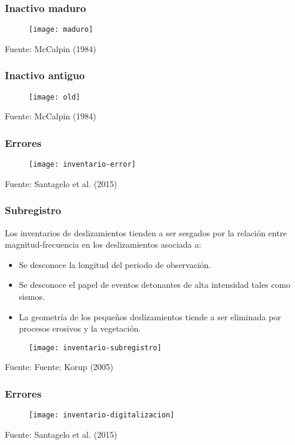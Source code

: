 \documentclass[12pt]{beamer}
\begin{document}
\begin{frame}
\frametitle{Inactivo maduro}
\begin{figure}
   	\texttt{[image: maduro]}
\end{figure}
\tiny{Fuente: McCalpin (1984)}
\end{frame}
\begin{frame}
\frametitle{Inactivo antiguo}
\begin{figure}
   	\texttt{[image: old]}
\end{figure}
\tiny{Fuente: McCalpin (1984)}
\end{frame}
\begin{frame}
\frametitle{Errores}
\begin{figure}
   	\texttt{[image: inventario-error]}
\end{figure}
\tiny{Fuente: Santagelo et al. (2015)}
\end{frame}
\begin{frame}
\frametitle{Subregistro}
\justifying
\scriptsize{Los inventarios de deslizamientos tienden a ser sesgados por la relación entre magnitud-frecuencia en los deslizamientos asociada a:
\begin{itemize}
\item Se desconoce la longitud del periodo de observación.
\item Se desconoce el papel de eventos detonantes de alta intensidad tales como sismos.
\item La geometría de los pequeños deslizamientos tiende a ser eliminada por procesos erosivos y la vegetación.
\end{itemize}
}
\begin{figure}
   	\texttt{[image: inventario-subregistro]}
\end{figure}
\tiny{Fuente: Fuente: Korup (2005)}
\end{frame}
\begin{frame}
\frametitle{Errores}
\begin{figure}
   	\texttt{[image: inventario-digitalizacion]}
\end{figure}
\tiny{Fuente: Santagelo et al. (2015)}
\end{frame}
\end{document}
